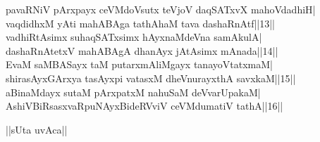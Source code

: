 \documentclass{article}
\begin{document}
pavaRNiV pArxpayx ceVMdoVsutx teVjoV daqSATxvX mahoVdadhiH|\\
vaqdidhxM yAti mahABAga tathAhaM tava dashaRnAtf||13||\\
vadhiRtAsimx suhaqSATxsimx hAyxnaMdeVna samAkulA|\\
dashaRnAtetxV mahABAgA dhanAyx jAtAsimx mAnada||14||\\
EvaM saMBASayx taM putarxmAliMgayx tanayoVtatxmaM|\\
shirasAyxGArxya tasAyxpi vatasxM dheVnurayxthA savxkaM||15||\\
aBinaMdayx sutaM pArxpatxM nahuSaM deVvarUpakaM|\\
AshiVBiRsasxvaRpuNAyxBideRVviV ceVMdumatiV tathA||16||\\

\begin{center}
||sUta uvAca||
\end{center}
\end{document}
